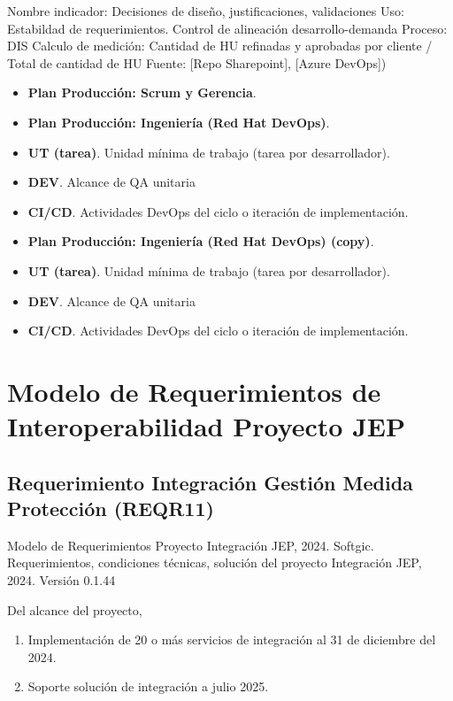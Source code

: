 \documentclass[
  paper=a4,
  ,captions=tableheading
]{scrartcl}
\providecommand{\tightlist}{%
  \setlength{\itemsep}{0pt}\setlength{\parskip}{0pt}}
\renewenvironment{quote}{\begin{customblockquote}\list{}{\rightmargin=0em\leftmargin=0em}%
\item\relax\color{blockquote-text}\ignorespaces}{\unskip\unskip\endlist\end{customblockquote}}
\begin{document}
Nombre indicador: Decisiones de diseño, justificaciones, validaciones
Uso: Estabildad de requerimientos. Control de alineación
desarrollo-demanda Proceso: DIS Calculo de medición: Cantidad de HU
refinadas y aprobadas por cliente / Total de cantidad de HU Fuente:
{[}Repo Sharepoint{]}, {[}Azure DevOps{]})

\begin{itemize}
\item
  \textbf{Plan Producción: Scrum y Gerencia}.
\item
  \textbf{Plan Producción: Ingeniería (Red Hat DevOps)}.
\item
  \textbf{UT (tarea)}. Unidad mínima de trabajo (tarea por
  desarrollador).
\item
  \textbf{DEV}. Alcance de QA unitaria
\item
  \textbf{CI/CD}. Actividades DevOps del ciclo o iteración de
  implementación.
\item
  \textbf{Plan Producción: Ingeniería (Red Hat DevOps) (copy)}.
\item
  \textbf{UT (tarea)}. Unidad mínima de trabajo (tarea por
  desarrollador).
\item
  \textbf{DEV}. Alcance de QA unitaria
\item
  \textbf{CI/CD}. Actividades DevOps del ciclo o iteración de
  implementación.
\end{itemize}

\newpage

\section{Modelo de Requerimientos de Interoperabilidad Proyecto
JEP}\label{sec:modelo-de-requerimientos-de-interoperabilidad-proyecto-jep}

\subsection{Requerimiento Integración Gestión Medida Protección
(REQR11)}\label{sec:requerimiento-integraciuxf3n-gestiuxf3n-medida-protecciuxf3n-reqr11}

\begin{quote}
Modelo de Requerimientos Proyecto Integración JEP, 2024. Softgic.
Requerimientos, condiciones técnicas, solución del proyecto Integración
JEP, 2024. Versión 0.1.44
\end{quote}

Del alcance del proyecto,

\begin{enumerate}
\def\labelenumi{\arabic{enumi}.}
\tightlist
\item
  Implementación de 20 o más servicios de integración al 31 de diciembre
  del 2024.
\item
  Soporte solución de integración a julio 2025.
\end{enumerate}
\end{document}
